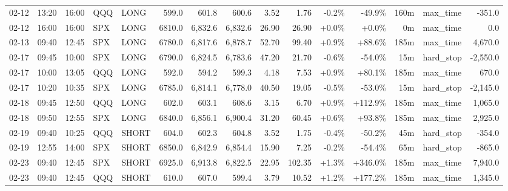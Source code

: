 \documentclass[11pt,a4paper,twoside]{article}
\begin{document}
\begin{landscape}
\begin{center}
\begin{longtable}{>{\color{txtmain}}l l l l l r r r r r r r r >{\color{txtmain}}l r}
02-12 & 13:20 & 16:00 & QQQ & LONG & 599.0 & 601.8 & 600.6 & 3.52 & 1.76 & \textcolor{lossred}{-0.2\%} & \textcolor{lossred}{-49.9\%} & 160m & max\_time & \textcolor{lossred}{-351.0} \\
02-12 & 16:00 & 16:00 & SPX & LONG & 6810.0 & 6,832.6 & 6,832.6 & 26.90 & 26.90 & \textcolor{wingreen}{+0.0\%} & \textcolor{wingreen}{+0.0\%} & 0m & max\_time & \textcolor{wingreen}{0.0} \\
02-13 & 09:40 & 12:45 & SPX & LONG & 6780.0 & 6,817.6 & 6,878.7 & 52.70 & 99.40 & \textcolor{wingreen}{+0.9\%} & \textcolor{wingreen}{+88.6\%} & 185m & max\_time & \textcolor{wingreen}{4,670.0} \\
02-17 & 09:45 & 10:00 & SPX & LONG & 6790.0 & 6,824.5 & 6,783.6 & 47.20 & 21.70 & \textcolor{lossred}{-0.6\%} & \textcolor{lossred}{-54.0\%} & 15m & hard\_stop & \textcolor{lossred}{-2,550.0} \\
02-17 & 10:00 & 13:05 & QQQ & LONG & 592.0 & 594.2 & 599.3 & 4.18 & 7.53 & \textcolor{wingreen}{+0.9\%} & \textcolor{wingreen}{+80.1\%} & 185m & max\_time & \textcolor{wingreen}{670.0} \\
02-17 & 10:20 & 10:35 & SPX & LONG & 6785.0 & 6,814.1 & 6,778.0 & 40.50 & 19.05 & \textcolor{lossred}{-0.5\%} & \textcolor{lossred}{-53.0\%} & 15m & hard\_stop & \textcolor{lossred}{-2,145.0} \\
02-18 & 09:45 & 12:50 & QQQ & LONG & 602.0 & 603.1 & 608.6 & 3.15 & 6.70 & \textcolor{wingreen}{+0.9\%} & \textcolor{wingreen}{+112.9\%} & 185m & max\_time & \textcolor{wingreen}{1,065.0} \\
02-18 & 09:50 & 12:55 & SPX & LONG & 6840.0 & 6,856.1 & 6,900.4 & 31.20 & 60.45 & \textcolor{wingreen}{+0.6\%} & \textcolor{wingreen}{+93.8\%} & 185m & max\_time & \textcolor{wingreen}{2,925.0} \\
02-19 & 09:40 & 10:25 & QQQ & SHORT & 604.0 & 602.3 & 604.8 & 3.52 & 1.75 & \textcolor{lossred}{-0.4\%} & \textcolor{lossred}{-50.2\%} & 45m & hard\_stop & \textcolor{lossred}{-354.0} \\
02-19 & 12:55 & 14:00 & SPX & SHORT & 6850.0 & 6,842.9 & 6,854.4 & 15.90 & 7.25 & \textcolor{lossred}{-0.2\%} & \textcolor{lossred}{-54.4\%} & 65m & hard\_stop & \textcolor{lossred}{-865.0} \\
02-23 & 09:40 & 12:45 & SPX & SHORT & 6925.0 & 6,913.8 & 6,822.5 & 22.95 & 102.35 & \textcolor{wingreen}{+1.3\%} & \textcolor{wingreen}{+346.0\%} & 185m & max\_time & \textcolor{wingreen}{7,940.0} \\
02-23 & 09:40 & 12:45 & QQQ & SHORT & 610.0 & 607.0 & 599.4 & 3.79 & 10.52 & \textcolor{wingreen}{+1.2\%} & \textcolor{wingreen}{+177.2\%} & 185m & max\_time & \textcolor{wingreen}{1,345.0} \\

\end{longtable}
\end{center}
\end{landscape}
\end{document}
